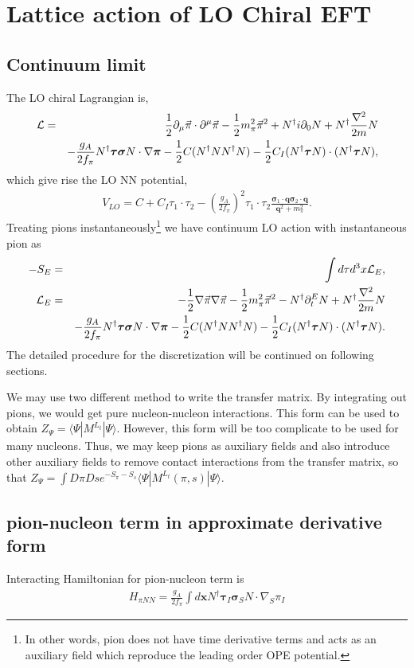 \documentclass[10pt]{book}
\def\bm{\boldsymbol}
\newcommand{\bea}{\begin{eqnarray}}
\newcommand{\eea}{\end{eqnarray}}
\newcommand{\no}{\nonumber \\}
\newcommand{\del}{\partial}
\def\vs{{\bm \sigma}}
\def\vq{{\bm q}}
\def\vx{{\bm x}}
\def\la{\langle}
\def\ra{\rangle}
\begin{document}
\section{Lattice action of LO Chiral EFT}
\subsection{Continuum limit}
The LO chiral Lagrangian is,
\bea 
{\cal L}&=&\frac{1}{2}\del_\mu{\vec{\pi}}\cdot\del^\mu{\vec{\pi}}
        -\frac{1}{2}m_\pi^2{\vec{\pi}}^2
        +N^\dagger i\del_0 N+N^\dagger \frac{\nabla^2}{2m} N \no  & &
        -\frac{g_A}{2f_\pi} N^\dagger{\bm\tau}\vs N\cdot\nabla{\bm \pi}
        -\frac{1}{2}C(N^\dagger N N^\dagger N)
        -\frac{1}{2}C_I (N^\dagger{\bm \tau}N)\cdot (N^\dagger{\bm \tau}N),
\eea  
which give rise the LO NN potential,
\bea 
V_{LO}=C+C_I\tau_1\cdot\tau_2 
   -(\frac{g_A}{2f_\pi})^2\tau_1\cdot\tau_2\frac{\vs_1\cdot\vq\vs_2\cdot\vq}{\vq^2+m_\pi^2}.
\eea 
Treating pions instantaneously\footnote{ 
In other words, pion does not have time derivative terms 
and acts as an auxiliary field which reproduce the leading order 
OPE potential.
}
we have continuum LO action with instantaneous pion as
\bea
-S_{E}&=&\int d\tau d^3 x {\cal L}_E ,\no 
{\cal L}_E&=&-\frac{1}{2}\nabla{\vec{\pi}}\nabla{\vec{\pi}}
             -\frac{1}{2}m_\pi^2 {\vec{\pi}}^2
             -N^\dagger \del_t^E N
             +N^\dagger \frac{\nabla^2}{2m} N  \no & & 
                     -\frac{g_A}{2f_\pi} N^\dagger{\bm\tau}\vs N\cdot\nabla{\bm \pi}
                     -\frac{1}{2}C(N^\dagger N N^\dagger N)
                     -\frac{1}{2}C_I (N^\dagger{\bm \tau}N)\cdot (N^\dagger{\bm \tau}N).
\eea 
The detailed procedure for the discretization will be continued on following sections.

We may use two different method to write the transfer matrix. 
By integrating out pions, we would get pure nucleon-nucleon interactions.
This form can be used to obtain $Z_\Psi=\la \Psi|M^{L_t}|\Psi\ra$. 
However, this form will be too complicate to be used for many nucleons.
Thus, we may keep pions as auxiliary fields and also introduce 
other auxiliary fields to remove contact interactions from the transfer matrix,
so that $Z_\Psi=\int D\pi Ds e^{-S_{\pi}-S_{s}} \la \Psi|M^{L_t}(\pi,s)|\Psi\ra $. 


\subsection{pion-nucleon term in approximate derivative form}
Interacting Hamiltonian for pion-nucleon term is
\bea 
H_{\pi NN}=\frac{g_A}{2f_\pi} \int d\vx  N^\dagger{\bm\tau}_I \vs_{S} N\cdot\nabla_{S} {\pi}_I
\eea 
\end{document}
